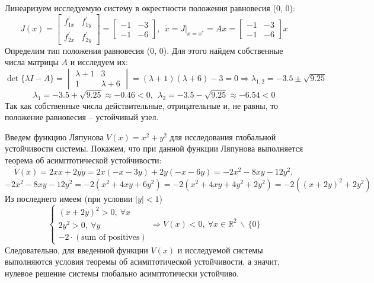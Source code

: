 \documentclass[a4paper, 12pt]{article}
\begin{document}
    Линеаризуем исследуемую систему в окрестности положения равновесия (0, 0):
    $$
    J(x)=
    \begin{bmatrix}
        f^{\prime}_{1x} & f^{\prime}_{1y}\\
        f^{\prime}_{2x} & f^{\prime}_{2y}
    \end{bmatrix}=
    \begin{bmatrix}
        -1 & -3\\
        -1 & -6
    \end{bmatrix},\ \
    \dot{x}=J|_{x=x^*}=Ax=
    \begin{bmatrix}
        -1 & -3\\
        -1 & -6
    \end{bmatrix}x
    $$
    Определим тип положения равновесия (0, 0). Для этого найдем собственные
    числа матрицы $A$ и исследуем их:
    $$
    \det{\{\lambda I-A\}}=
    \begin{vmatrix}
        \lambda+1 & 3\\
        1 & \lambda+6
    \end{vmatrix}=
    \left(\lambda+1\right)\left(\lambda+6\right)-3=0\Rightarrow
    \lambda_{1,2}=-3.5\pm\sqrt{9.25}
    $$
    $$
    \lambda_1=-3.5+\sqrt{9.25}\approx-0.46<0,\ \ \lambda_2=-3.5-\sqrt{9.25}\approx-6.54<0
    $$
    Так как собственные числа действительные, отрицательные и, не равны, то положение равновесия -- устойчивый узел.


    Введем функцию Ляпунова $V(x)=x^2+y^2$ для исследования глобальной устойчивости
    системы. Покажем, что при данной функции Ляпунова выполняется теорема об асимптотической
    устойчивости:
    $$
    \dot{V}(x)=2x\dot{x}+2y\dot{y}=2x\left(-x-3y\right)+2y\left(-x-6y\right)=-2x^2-8xy-12y^2,
    $$
    $$
    -2x^2-8xy-12y^2=-2\left(x^2+4xy+6y^2\right)=-2\left(x^2+4xy+4y^2+2y^2\right)=-2\left(\left(x+2y\right)^2+2y^2\right)
    $$
    Из последнего имеем (при условии $|y|<1$)
    $$
    \begin{cases}
        \left(x+2y\right)^2>0,\ \forall x\\
        2y^2>0,\ \forall y\\
        -2\cdot\left(\text{sum of positives}\right)
    \end{cases}\Rightarrow
    \dot{V}(x)<0,\ \forall x\in\mathbb{R}^2\,\backslash\,\{0\}
    $$
    Следовательно, для введенной функции $V(x)$ и исследуемой системы выполняются
    условия теоремы об асимптотической устойчивости, а значит, нулевое решение системы
    глобально асимптотически устойчиво.
\end{document}

